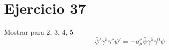 \section*{Ejercicio 37}
Mostrar para 2, 3, 4, 5
\begin{equation*}
{\bar{\psi}}' \gamma^5 \gamma^\nu {\psi}' = -a^\nu_\mu \bar{\psi} \gamma^5 \gamma^0 \psi
\end{equation*}